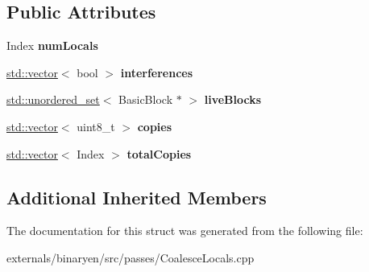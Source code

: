 \subsection*{Public Attributes}
\begin{DoxyCompactItemize}
\item 
\mbox{\label{structwasm_1_1_coalesce_locals_acec4c2c65aea69cc3a7f53b96700a19a}} 
Index {\bfseries num\+Locals}
\item 
\mbox{\label{structwasm_1_1_coalesce_locals_aeadcc59d8b731c8eff327e7307f870bb}} 
\mbox{\hyperlink{classstd_1_1vector}{std\+::vector}}$<$ bool $>$ {\bfseries interferences}
\item 
\mbox{\label{structwasm_1_1_coalesce_locals_ab69087ee417b8d016e0d9b5959e98948}} 
\mbox{\hyperlink{classstd_1_1unordered__set}{std\+::unordered\+\_\+set}}$<$ Basic\+Block $\ast$ $>$ {\bfseries live\+Blocks}
\item 
\mbox{\label{structwasm_1_1_coalesce_locals_a28fe286086cc619edbd7baeee859a4e2}} 
\mbox{\hyperlink{classstd_1_1vector}{std\+::vector}}$<$ uint8\+\_\+t $>$ {\bfseries copies}
\item 
\mbox{\label{structwasm_1_1_coalesce_locals_a2a93daa32df43f27088a93abf5fbd526}} 
\mbox{\hyperlink{classstd_1_1vector}{std\+::vector}}$<$ Index $>$ {\bfseries total\+Copies}
\end{DoxyCompactItemize}
\subsection*{Additional Inherited Members}


The documentation for this struct was generated from the following file\+:\begin{DoxyCompactItemize}
\item 
externals/binaryen/src/passes/Coalesce\+Locals.\+cpp\end{DoxyCompactItemize}
